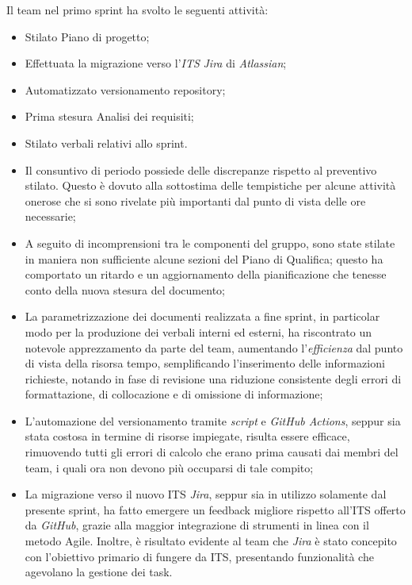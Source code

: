 \documentclass[10pt, a4paper]{article}
\begin{document}
Il team nel primo sprint ha svolto le seguenti attività:
\begin{itemize}
    \item Stilato Piano di progetto;
    \item Effettuata la migrazione verso l'\textit{ITS\pg} \textit{Jira\pg} di \textit{Atlassian};
    \item Automatizzato versionamento repository;
    \item Prima stesura Analisi dei requisiti;
    \item Stilato verbali relativi allo sprint.
\end{itemize}
\begin{itemize}
\item Il consuntivo di periodo possiede delle discrepanze rispetto al preventivo stilato. Questo è dovuto alla sottostima delle 
tempistiche per alcune attività onerose che si sono rivelate più importanti dal punto di vista delle ore necessarie;
\item A seguito di incomprensioni tra le componenti del gruppo, sono state stilate in maniera non sufficiente alcune sezioni del 
Piano di Qualifica; questo ha comportato un ritardo e un aggiornamento della pianificazione che tenesse conto della nuova stesura del documento;
\item La parametrizzazione dei documenti realizzata a fine sprint, in particolar modo per la produzione dei verbali interni ed esterni, ha riscontrato un notevole apprezzamento
da parte del team, aumentando l'\textit{efficienza\pg} dal punto di vista della risorsa tempo, semplificando l'inserimento delle informazioni richieste, notando
in fase di revisione una riduzione consistente degli errori di formattazione, di collocazione e di omissione di informazione;
\item L'automazione del versionamento tramite \textit{script\pg} e \textit{GitHub Actions\pg}, seppur sia stata costosa in termine di risorse impiegate,
risulta essere efficace, rimuovendo tutti gli errori di calcolo che erano prima causati dai membri del team, i quali ora non devono più occuparsi di tale compito;
\item La migrazione verso il nuovo ITS \textit{Jira}, seppur sia in utilizzo solamente dal presente sprint, ha fatto emergere un feedback migliore rispetto all'ITS 
offerto da \textit{GitHub}, grazie alla maggior integrazione di strumenti in linea con il metodo Agile. Inoltre, è risultato evidente al team che \textit{Jira} è stato concepito 
con l'obiettivo primario di fungere da ITS, presentando funzionalità che agevolano la gestione dei task.
\end{itemize}
\end{document}
